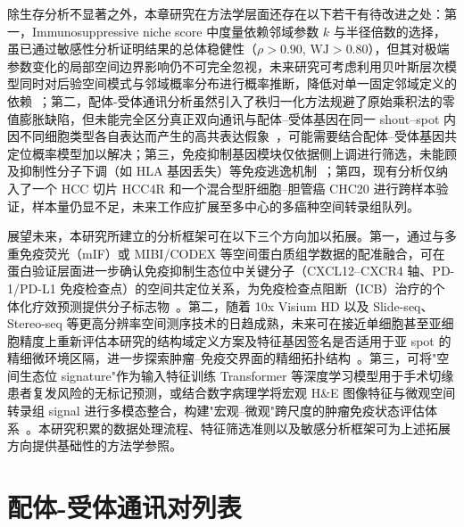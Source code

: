 \documentclass[12pt, a4paper]{ctexart}
\begin{document}
除生存分析不显著之外，本章研究在方法学层面还存在以下若干有待改进之处：第一，Immunosuppressive niche score 中度量依赖邻域参数 $k$ 与半径倍数的选择，虽已通过敏感性分析证明结果的总体稳健性（$\rho > 0.90$, $\text{WJ} > 0.80$），但其对极端参数变化的局部空间边界影响仍不可完全忽视，未来研究可考虑利用贝叶斯层次模型同时对后验空间模式与邻域概率分布进行概率推断，降低对单一固定邻域定义的依赖~\citep{kleshchevnikov2022cell2location,gelman2013bayesian}；第二，配体-受体通讯分析虽然引入了秩归一化方法规避了原始乘积法的零值膨胀缺陷，但未能完全区分真正双向通讯与配体--受体基因在同一 shout--spot 内因不同细胞类型各自表达而产生的高共表达假象~\citep{cang2023commot}，可能需要结合配体--受体基因共定位概率模型加以解决；第三，免疫抑制基因模块仅依据侧上调进行筛选，未能顾及抑制性分子下调（如 HLA 基因丢失）等免疫逃逸机制~\citep{montesion2021hla}；第四，现有分析仅纳入了一个 HCC 切片 HCC4R 和一个混合型肝细胞--胆管癌 CHC20 进行跨样本验证，样本量仍显不足，未来工作应扩展至多中心的多癌种空间转录组队列。

展望未来，本研究所建立的分析框架可在以下三个方向加以拓展。第一，通过与多重免疫荧光（mIF）或 MIBI/CODEX 等空间蛋白质组学数据的配准融合，可在蛋白验证层面进一步确认免疫抑制生态位中关键分子（CXCL12--CXCR4 轴、PD-1/PD-L1 免疫检查点）的空间共定位关系，为免疫检查点阻断（ICB）治疗的个体化疗效预测提供分子标志物~\citep{keren2018structured,zhu2021spark}。第二，随着 10x Visium HD 以及 Slide-seq、Stereo-seq 等更高分辨率空间测序技术的日趋成熟，未来可在接近单细胞甚至亚细胞精度上重新评估本研究的结构域定义方案及特征基因签名是否适用于亚 spot 的精细微环境区隔，进一步探索肿瘤--免疫交界面的精细拓扑结构~\citep{moses2022museum,chen2022spatia}。第三，可将"空间生态位 signature"作为输入特征训练 Transformer 等深度学习模型用于手术切缘患者复发风险的无标记预测，或结合数字病理学将宏观 H\&E 图像特征与微观空间转录组 signal 进行多模态整合，构建"宏观--微观"跨尺度的肿瘤免疫状态评估体系~\citep{chen2016liver,shmatko2022artific}。本研究积累的数据处理流程、特征筛选准则以及敏感分析框架可为上述拓展方向提供基础性的方法学参照。


\newpage
\appendix
\renewcommand{\thesection}{\Alph{section}}

\section{配体-受体通讯对列表}
\label{app:lr_table}
\end{document}
